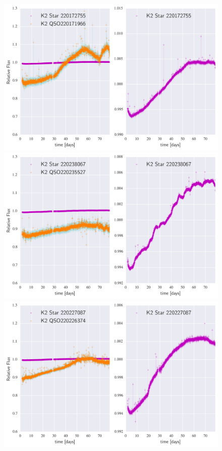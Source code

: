 \documentclass[a4paper,fleqn,usenatbib]{mnras}
\begin{document}
          
          
          
                    \begin{figure}
 	\includegraphics[width=\columnwidth]{220171966NearestNeighbor.png}
 	\includegraphics[width=\columnwidth]{220235527NearestNeighbor.png}
 	\includegraphics[width=\columnwidth]{220226374NearestNeighbor.png}
                    	\caption{}
                    	\label{fig:example_figure}
                    \end{figure}
                    
\end{document}
